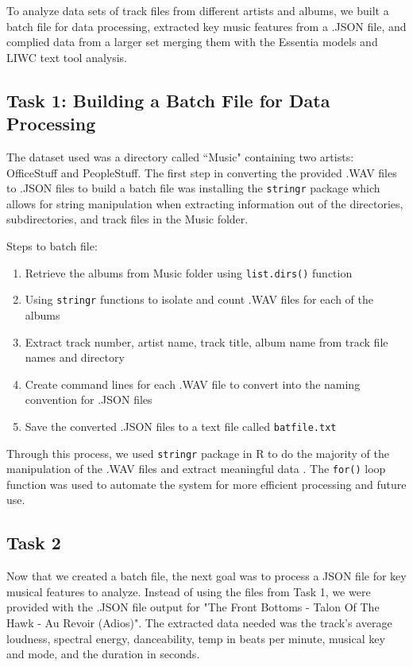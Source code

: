 \documentclass{article}\usepackage[]{graphicx}\usepackage[]{xcolor}
\begin{document}
\begin{multicols}{2}
To analyze data sets of track files from different artists and albums, we built a batch file for data processing, extracted key music features from a .JSON file, and complied data from a larger set merging them with the Essentia models and LIWC text tool analysis.

\subsection{Task 1: Building a Batch File for Data Processing}

The dataset used was a directory called ``Music" containing two artists: OfficeStuff and PeopleStuff. The first step in converting the provided .WAV files to .JSON files to build a batch file was installing the \texttt{stringr} package which allows for string manipulation when extracting information out of the directories, subdirectories, and track files in the Music folder. 

Steps to batch file:
\begin{enumerate}
  \item Retrieve the albums from Music folder using \texttt{list.dirs()} function
  \item Using \texttt{stringr} functions to isolate and count .WAV files for each of the albums
  \item Extract track number, artist name, track title, album name from track file names and directory
  \item Create command lines for each .WAV file to convert into the naming convention for .JSON files
  \item Save the converted .JSON files to a text file called \texttt{batfile.txt}
\end{enumerate}
Through this process, we used \texttt{stringr} package in R to do the majority of the manipulation of the .WAV files and extract meaningful data \citep{Wickham}. The \texttt{for()} loop function was used to automate the system for more efficient processing and future use.

\subsection{Task 2}

Now that we created a batch file, the next goal was to process a JSON file for key musical features to analyze. Instead of using the files from Task 1, we were provided with the .JSON file output for "The Front Bottoms - Talon Of The Hawk - Au Revoir (Adios)". The extracted data needed was the track's average loudness, spectral energy, danceability, temp in beats per minute, musical key and mode, and the duration in seconds.


\end{multicols}
\end{document}
